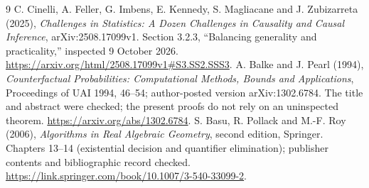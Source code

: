 \documentclass[11pt]{article}
\theoremstyle{remark}
\begin{document}
\begin{thebibliography}{9}
 C. Cinelli, A. Feller, G. Imbens, E. Kennedy, S. Magliacane and J. Zubizarreta (2025), \emph{Challenges in Statistics: A Dozen Challenges in Causality and Causal Inference}, arXiv:2508.17099v1. Section 3.2.3, ``Balancing generality and practicality,'' inspected 9 October 2026. \url{https://arxiv.org/html/2508.17099v1#S3.SS2.SSS3}.
 A. Balke and J. Pearl (1994), \emph{Counterfactual Probabilities: Computational Methods, Bounds and Applications}, Proceedings of UAI 1994, 46--54; author-posted version arXiv:1302.6784. The title and abstract were checked; the present proofs do not rely on an uninspected theorem. \url{https://arxiv.org/abs/1302.6784}.
 S. Basu, R. Pollack and M.-F. Roy (2006), \emph{Algorithms in Real Algebraic Geometry}, second edition, Springer. Chapters 13--14 (existential decision and quantifier elimination); publisher contents and bibliographic record checked. \url{https://link.springer.com/book/10.1007/3-540-33099-2}.
\end{thebibliography}
\end{document}
